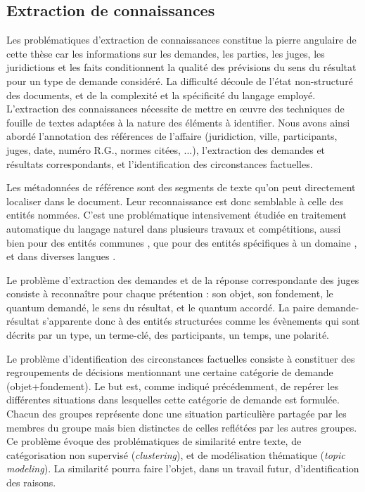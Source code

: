 \subsection{Extraction de connaissances}
\label{subsec:intro:ie}
Les problématiques d'extraction de connaissances constitue la pierre angulaire de cette thèse car les informations sur les demandes, les parties, les juges, les juridictions et les faits conditionnent la qualité des prévisions du sens du résultat pour un type de demande considéré.  La difficulté découle de l'état non-structuré des documents, et de la complexité et la spécificité du langage employé. L'extraction des connaissances nécessite de mettre en \oe uvre des techniques de fouille de textes adaptées à la nature des éléments à identifier. Nous avons ainsi abordé l'annotation des références de l'affaire (juridiction, ville, participants, juges, date, numéro R.G., normes citées, ...), l'extraction des demandes et résultats correspondants, et l'identification des circonstances factuelles.

Les métadonnées de référence sont des segments de texte qu'on peut directement localiser dans le document. Leur reconnaissance est donc semblable à celle des entités nommées. C'est une problématique intensivement étudiée en traitement automatique du langage naturel \citep{yadav2018surveyNeuralNER} dans plusieurs travaux et compétitions, aussi bien pour des entités communes \citep{tjong2003introCoNLL,grishman1996muc6}, que pour des entités spécifiques à un domaine \citep{kim2004bioNer, persson2012nbbioner,hanisch2005prominer}, et dans diverses langues \citep{li2018wcpbioner,alfred2014malayner,amarappa2015kannada}. 

Le problème d'extraction des demandes et de la réponse correspondante des juges consiste à reconnaître pour chaque prétention : son objet, son fondement, le quantum demandé, le sens du résultat, et le quantum accordé. La paire demande-résultat s'apparente donc à des entités structurées comme les évènements \cite{ace2005event} qui sont décrits par un type, un terme-clé, des participants, un temps, une polarité.

Le problème d'identification des circonstances factuelles consiste à constituer des regroupements de décisions mentionnant une certaine catégorie de demande (objet+fondement). Le but est, comme indiqué précédemment, de repérer les différentes situations dans lesquelles cette catégorie de demande est formulée. Chacun des groupes représente donc une situation particulière partagée par les membres du groupe mais bien distinctes de celles reflétées par les autres groupes. Ce problème évoque des problématiques de similarité entre texte, de catégorisation non supervisé (\textit{clustering}), et de \og modélisation thématique \fg{} (\textit{topic modeling}).  La similarité pourra faire l'objet, dans un travail futur, d'identification des raisons.

